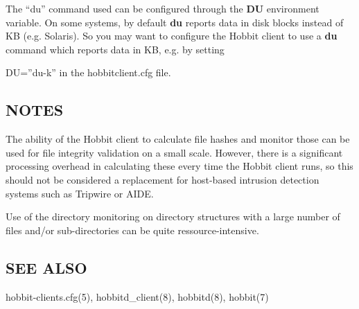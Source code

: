  The ``du'' command used can be configured through the \textbf{DU}
 environment variable. On some systems, by default \textbf{du}
 reports data in disk blocks instead of KB (e.g. Solaris). So you may want to configure the Hobbit client to use a \textbf{du}
 command which reports data in KB, e.g. by setting  
 
DU=''du-k''  
 in the hobbitclient.cfg file. 


 
\subsection{NOTES}
 The ability of the Hobbit client to calculate file hashes and monitor
 those can be used for file integrity validation on a small
 scale. However, there is a significant processing overhead in
 calculating these every time the Hobbit client runs, so this should
 not be considered a replacement for host-based intrusion detection
 systems such as Tripwire or AIDE. 


  Use of the directory monitoring on directory structures with a large number of files and/or sub-directories can be quite ressource-intensive. 


 
\subsection{SEE ALSO}
hobbit-clients.cfg(5), hobbitd\_client(8), hobbitd(8), hobbit(7) 
